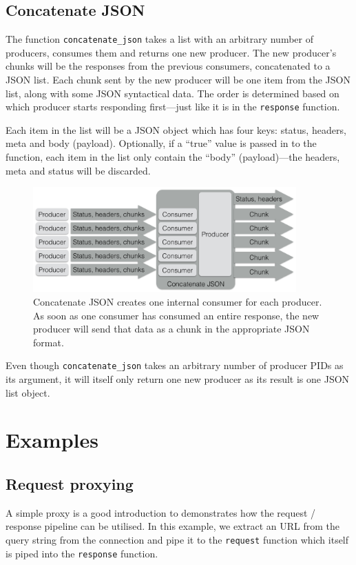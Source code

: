 \documentclass{cslthse-msc}
\begin{document}
\subsection{Concatenate JSON}
The function \lstinline{concatenate_json} takes a list with an arbitrary number of producers, consumes them and returns one new producer. The new producer's chunks will be the responses from the previous consumers, concatenated to a JSON list. Each chunk sent by the new producer will be one item from the JSON list, along with some JSON syntactical data. The order is determined based on which producer starts responding first---just like it is in the \lstinline{response} function.

Each item in the list will be a JSON object which has four keys: status, headers, meta and body (payload). Optionally, if a \enquote{true} value is passed in to the function, each item in the list only contain the \enquote{body} (payload)---the headers, meta and status will be discarded.


\begin{figure}[H]
  \centering
    \begin{center}
      \includegraphics[width=0.9\textwidth]{images/crocpear_concatenate_json.png}
    \end{center}
  \caption{Concatenate JSON creates one internal consumer for each producer. As soon as one consumer has consumed an entire response, the new producer will send that data as a chunk in the appropriate JSON format.}
\end{figure}

Even though \lstinline{concatenate_json} takes an arbitrary number of producer PIDs as its argument, it will itself only return one new producer as its result is one JSON list object.

\section{Examples}
\subsection{Request proxying}
A simple proxy is a good introduction to demonstrates how the request / response pipeline can be utilised. In this example, we extract an URL from the query string from the connection and pipe it to the \lstinline{request} function which itself is piped into the \lstinline{response} function.
\end{document}

